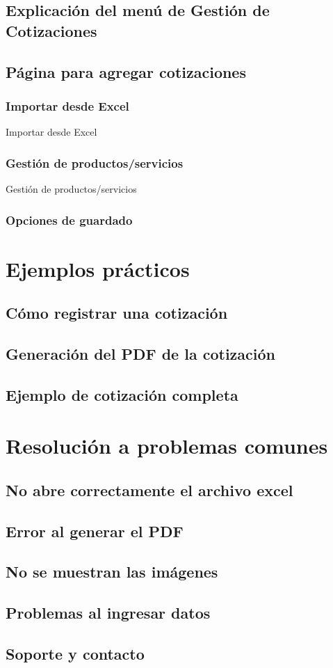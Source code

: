 \documentclass{Pretexto/bluereport}
\begin{document}
\subsection{Explicación del menú de Gestión de Cotizaciones}
\subsection{Página para agregar cotizaciones}
\subsubsection{Importar desde Excel}
Importar desde Excel
\subsubsection{Gestión de productos/servicios}
Gestión de productos/servicios
\subsubsection{Opciones de guardado}

\section{Ejemplos prácticos}
\subsection{Cómo registrar una cotización}
\subsection{Generación del PDF de la cotización}
\subsection{Ejemplo de cotización completa}
\section{Resolución a problemas comunes}
\subsection{No abre correctamente el archivo excel}
\subsection{Error al generar el PDF}
\subsection{No se muestran las imágenes}
\subsection{Problemas al ingresar datos}
\subsection{Soporte y contacto}
\pagebreak
\end{document}
